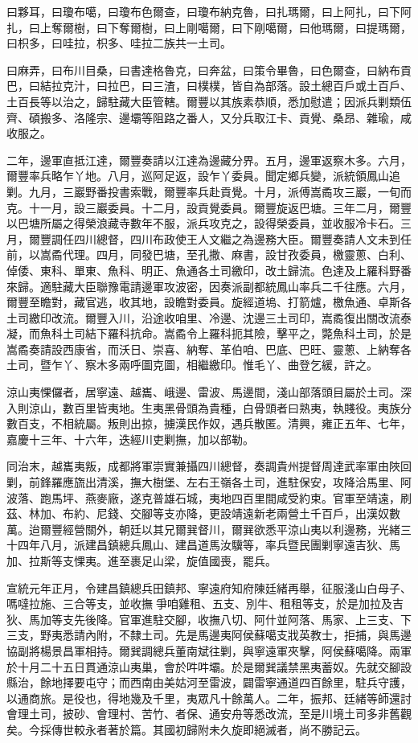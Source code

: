 \begin{pinyinscope}
曰夥耳，曰瓊布噶，曰瓊布色爾查，曰瓊布納克魯，曰扎瑪爾，曰上阿扎，曰下阿扎，曰上奪爾樹，曰下奪爾樹，曰上剛噶爾，曰下剛噶爾，曰他瑪爾，曰提瑪爾，曰枳多，曰哇拉，枳多、哇拉二族共一土司。

曰麻弄，曰布川目桑，曰書達格魯克，曰奔盆，曰策令畢魯，曰色爾查，曰納布貢巴，曰結拉克汁，曰拉巴，曰三渣，曰樸樸，皆自為部落。設土總百戶或土百戶、土百長等以治之，歸駐藏大臣管轄。爾豐以其族素恭順，悉加慰遣；因派兵剿類伍齊、碩搬多、洛隆宗、邊壩等阻路之番人，又分兵取江卡、貢覺、桑昂、雜瑜，咸收服之。

二年，邊軍直抵江達，爾豐奏請以江達為邊藏分界。五月，邊軍返察木多。六月，爾豐率兵略乍丫地。八月，巡阿足返，設乍丫委員。聞定鄉兵變，派統領鳳山追剿。九月，三巖野番投書索戰，爾豐率兵赴貢覺。十月，派傅嵩矞攻三巖，一旬而克。十一月，設三巖委員。十二月，設貢覺委員。爾豐旋返巴塘。三年二月，爾豐以巴塘所屬之得榮浪藏寺數年不服，派兵攻克之，設得榮委員，並收服冷卡石。三月，爾豐調任四川總督，四川布政使王人文繼之為邊務大臣。爾豐奏請人文未到任前，以嵩矞代理。四月，同發巴塘，至孔撒、麻書，設甘孜委員，檄靈蔥、白利、倬倭、東科、單東、魚科、明正、魚通各土司繳印，改土歸流。色達及上羅科野番來歸。適駐藏大臣聯豫電請邊軍攻波密，因奏派副都統鳳山率兵二千往應。六月，爾豐至瞻對，藏官逃，收其地，設瞻對委員。旋經道塢、打箭爐，檄魚通、卓斯各土司繳印改流。爾豐入川，沿途收咱里、冷邊、沈邊三土司印，嵩矞復出關改流泰凝，而魚科土司結下羅科抗命。嵩矞令上羅科扼其險，擊平之，斃魚科土司，於是嵩矞奏請設西康省，而沃日、崇喜、納奪、革伯咱、巴底、巴旺、靈蔥、上納奪各土司，暨乍丫、察木多兩呼圖克圖，相繼繳印。惟毛丫、曲登乞緩，許之。

涼山夷惈儸者，居寧遠、越巂、峨邊、雷波、馬邊間，淺山部落頭目屬於土司。深入則涼山，數百里皆夷地。生夷黑骨頭為貴種，白骨頭者曰熟夷，執賤役。夷族分數百支，不相統屬。叛則出掠，擄漢民作奴，遇兵散匿。清興，雍正五年、七年，嘉慶十三年、十六年，迭經川吏剿撫，加以部勒。

同治末，越巂夷叛，成都將軍崇實兼攝四川總督，奏調貴州提督周達武率軍由陜回剿，前鋒羅應旒出清溪，撫大樹堡、左右王嶺各土司，進駐保安，攻降洽馬里、阿波落、跑馬坪、燕麥廠，遂克普雄石城，夷地四百里間咸受約束。官軍至靖遠，刷茲、林加、布約、尼錢、交腳等支亦降，更設靖遠新老兩營土千百戶，出漢奴數萬。迨爾豐經營關外，朝廷以其兄爾巽督川，爾巽欲悉平涼山夷以利邊務，光緒三十四年八月，派建昌鎮總兵鳳山、建昌道馬汝驥等，率兵暨民團剿寧遠吉狄、馬加、拉斯等支惈夷。進至裹足山梁，旋值國喪，罷兵。

宣統元年正月，令建昌鎮總兵田鎮邦、寧遠府知府陳廷緒再舉，征服淺山白母子、嗎噠拉施、三合等支，並收撫爭咱雞租、五支、別牛、租租等支，於是加拉及吉狄、馬加等支先後降。官軍進駐交腳，收撫八切、阿什並阿落、馬家、上三支、下三支，野夷悉請內附，不隸土司。先是馬邊夷阿侯蘇噶支戕英教士，拒捕，與馬邊協副將楊景昌軍相持。爾巽調總兵董南斌往剿，與寧遠軍夾擊，阿侯蘇噶降。兩軍於十月二十五日貫通涼山夷巢，會於吽吽壩。於是爾巽議禁黑夷蓄奴。先就交腳設縣治，餘地擇要屯守；而西南由美姑河至雷波，闢雷寧通道四百餘里，駐兵守護，以通商旅。是役也，得地幾及千里，夷眾凡十餘萬人。二年，振邦、廷緒等師還討會理土司，披砂、會理村、苦竹、者保、通安舟等悉改流，至是川境土司多非舊觀矣。今採傳世較永者著於篇。其國初歸附未久旋即絕滅者，尚不勝記云。


\end{pinyinscope}
